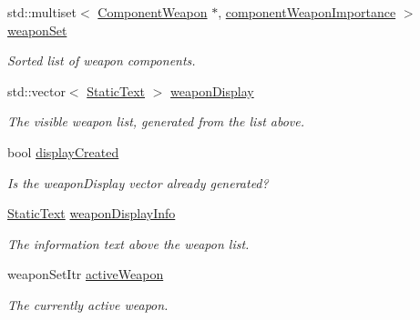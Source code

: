 \begin{DoxyCompactItemize}
\item 
\hypertarget{classWeaponInventory_a8a74e279a87fa5f0473e3868533f40c1}{
std\-::multiset$<$ \hyperlink{classComponentWeapon}{\-Component\-Weapon} \*
$\ast$, \hyperlink{structcomponentWeaponImportance}{component\-Weapon\-Importance} $>$ \hyperlink{classWeaponInventory_a8a74e279a87fa5f0473e3868533f40c1}{weapon\-Set}}
\label{d8/da9/classWeaponInventory_a8a74e279a87fa5f0473e3868533f40c1}

\begin{DoxyCompactList}\small\item\em \-Sorted list of weapon components. \end{DoxyCompactList}\item 
\hypertarget{classWeaponInventory_a1bb7834f1f5547b5fa91be385feeb964}{
std\-::vector$<$ \hyperlink{classStaticText}{\-Static\-Text} $>$ \hyperlink{classWeaponInventory_a1bb7834f1f5547b5fa91be385feeb964}{weapon\-Display}}
\label{d8/da9/classWeaponInventory_a1bb7834f1f5547b5fa91be385feeb964}

\begin{DoxyCompactList}\small\item\em \-The visible weapon list, generated from the list above. \end{DoxyCompactList}\item 
\hypertarget{classWeaponInventory_aca0755d77218575eef91fc54777ef3c1}{
bool \hyperlink{classWeaponInventory_aca0755d77218575eef91fc54777ef3c1}{display\-Created}}
\label{d8/da9/classWeaponInventory_aca0755d77218575eef91fc54777ef3c1}

\begin{DoxyCompactList}\small\item\em \-Is the weapon\-Display vector already generated? \end{DoxyCompactList}\item 
\hypertarget{classWeaponInventory_adfa9884dd1d4963e8e7d422378fabb07}{
\hyperlink{classStaticText}{\-Static\-Text} \hyperlink{classWeaponInventory_adfa9884dd1d4963e8e7d422378fabb07}{weapon\-Display\-Info}}
\label{d8/da9/classWeaponInventory_adfa9884dd1d4963e8e7d422378fabb07}

\begin{DoxyCompactList}\small\item\em \-The information text above the weapon list. \end{DoxyCompactList}\item 
\hypertarget{classWeaponInventory_a43109964fa78e2a9a4fdc8c1657d578e}{
weapon\-Set\-Itr \hyperlink{classWeaponInventory_a43109964fa78e2a9a4fdc8c1657d578e}{active\-Weapon}}
\label{d8/da9/classWeaponInventory_a43109964fa78e2a9a4fdc8c1657d578e}

\begin{DoxyCompactList}\small\item\em \-The currently active weapon. \end{DoxyCompactList}\end{DoxyCompactItemize}


